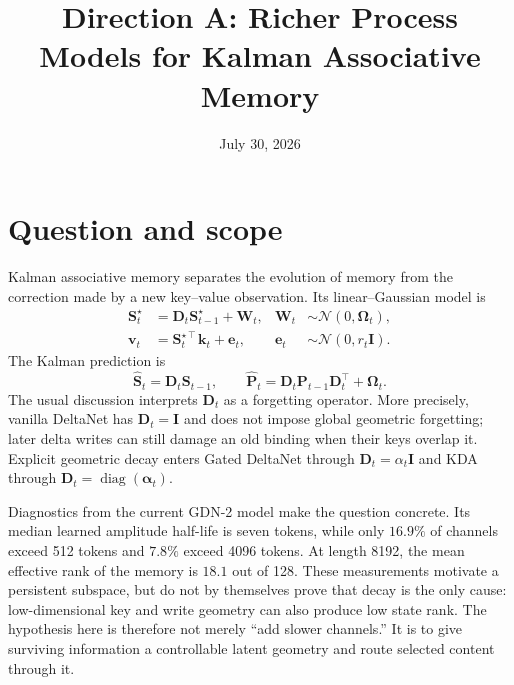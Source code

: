 \documentclass[11pt]{article}
\title{Direction A: Richer Process Models for Kalman Associative Memory}
\author{}
\date{July 30, 2026}
\newcommand{\ve}[1]{\boldsymbol{#1}}
\newcommand{\tr}{\intercal}
\newcommand{\I}{\ve{I}}
\newcommand{\N}{\mathcal{N}}
\DeclareMathOperator{\diag}{diag}
\begin{document}
\maketitle

\section{Question and scope}

Kalman associative memory separates the evolution of memory from the correction made by a
new key--value observation. Its linear--Gaussian model is
\begin{align}
  \ve{S}_t^\star
    &= \ve{D}_t\ve{S}_{t-1}^\star+\ve{W}_t,
  &
  \ve{W}_t&\sim\N(0,\ve{\Omega}_t),
  \label{eq:base-process}\\
  \ve{v}_t
    &= \ve{S}_t^{\star\tr}\ve{k}_t+\ve{e}_t,
  &
  \ve{e}_t&\sim\N(0,r_t\I).
  \label{eq:base-observation}
\end{align}
The Kalman prediction is
\begin{equation}
  \widehat{\ve{S}}_t=\ve{D}_t\ve{S}_{t-1},
  \qquad
  \widehat{\ve{P}}_t
  =\ve{D}_t\ve{P}_{t-1}\ve{D}_t^{\tr}+\ve{\Omega}_t.
  \label{eq:base-prediction}
\end{equation}
The usual discussion interprets $\ve{D}_t$ as a forgetting operator. More precisely,
vanilla DeltaNet has $\ve{D}_t=\I$ and does not impose global geometric forgetting;
later delta writes can still damage an old binding when their keys overlap it. Explicit
geometric decay enters Gated DeltaNet through $\ve{D}_t=\alpha_t\I$ and KDA through
$\ve{D}_t=\diag(\ve{\alpha}_t)$.

Diagnostics from the current GDN-2 model make the question concrete. Its median learned
amplitude half-life is seven tokens, while only $16.9\%$ of channels exceed 512 tokens and
$7.8\%$ exceed 4096 tokens. At length 8192, the mean effective rank of the memory is
$18.1$ out of 128. These measurements motivate a persistent subspace, but do not by
themselves prove that decay is the only cause: low-dimensional key and write geometry can
also produce low state rank. The hypothesis here is therefore not merely ``add slower
channels.'' It is to give surviving information a controllable latent geometry and route
selected content through it.
\end{document}
